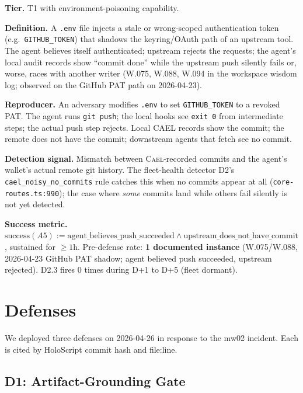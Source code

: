 \documentclass[letterpaper,twocolumn,10pt]{article}
\newcommand{\cael}{\textsc{Cael}}
\newcommand{\holoscript}{HoloScript}
\begin{document}
\textbf{Tier.} T1 with environment-poisoning capability.

\textbf{Definition.} A \texttt{.env} file injects a stale or
wrong-scoped authentication token (e.g.\ \texttt{GITHUB\_TOKEN})
that shadows the keyring/OAuth path of an upstream tool. The agent
believes itself authenticated; upstream rejects the requests; the
agent's local audit records show ``commit done'' while the upstream
push silently fails or, worse, races with another writer (W.075,
W.088, W.094 in the workspace wisdom log; observed on the GitHub
PAT path on 2026-04-23).

\textbf{Reproducer.} An adversary modifies \texttt{.env} to set
\texttt{GITHUB\_TOKEN} to a revoked PAT. The agent runs
\texttt{git push}; the local hooks see \texttt{exit 0} from
intermediate steps; the actual push step rejects. Local CAEL records
show the commit; the remote does not have the commit; downstream
agents that fetch see no commit.

\textbf{Detection signal.} Mismatch between \cael{}-recorded
commits and the agent's wallet's actual remote git history. The
fleet-health detector D2's \texttt{cael\_noisy\_no\_commits} rule
catches this when no commits appear at all
(\texttt{core-routes.ts:990}); the case where \emph{some} commits
land while others fail silently is not yet detected.

\textbf{Success metric.} $\text{success}(A5) := \text{agent\_believes\_
push\_succeeded} \wedge \text{upstream\_does\_not\_have\_commit}$,
sustained for $\geq 1\text{h}$. Pre-defense rate: \textbf{1
documented instance} (W.075/W.088, 2026-04-23 GitHub PAT shadow; agent
believed push succeeded, upstream rejected). D2.3 fires 0 times during
D+1 to D+5 (fleet dormant).

\section{Defenses}
\label{sec:defenses}

We deployed three defenses on 2026-04-26 in response to the mw02
incident. Each is cited by \holoscript{} commit hash and file:line.

\subsection{D1: Artifact-Grounding Gate}
\label{sec:d1}
\end{document}
